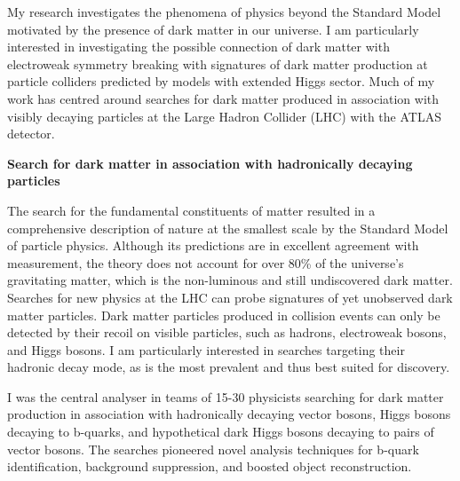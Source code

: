 \documentclass{article}
\begin{document}
\raisebox{.5cm}

My research investigates the phenomena of physics beyond the Standard Model motivated by the presence of dark matter in our universe. I am particularly interested in investigating the possible connection of dark matter with electroweak symmetry breaking with signatures of dark matter production at particle colliders predicted by models with extended Higgs sector. Much of my work has centred around searches for dark matter produced in association with visibly decaying particles at the Large Hadron Collider (LHC) with the ATLAS detector.

\bigskip
{\bf Search for dark matter in association with hadronically decaying particles}
\medskip

The search for the fundamental constituents of matter resulted in a comprehensive description of nature at the smallest scale by the Standard Model of particle physics. Although its predictions are in excellent agreement with measurement, the theory does not account for over 80\% of the universe's gravitating matter, which is the non-luminous and still undiscovered dark matter. Searches for new physics at the LHC can probe signatures of yet unobserved dark matter particles. Dark matter particles produced in collision events can only be detected by their recoil on visible particles, such as hadrons, electroweak bosons, and Higgs bosons. I am particularly interested in searches targeting their hadronic decay mode, as is the most prevalent and thus best suited for discovery.


I was the central analyser in teams of 15-30 physicists searching for dark matter production in association with hadronically decaying vector bosons, Higgs bosons decaying to b-quarks, and hypothetical dark Higgs bosons decaying to pairs of vector bosons. The searches pioneered novel analysis techniques for b-quark identification, background suppression, and boosted object reconstruction.

\medskip
\end{document}
